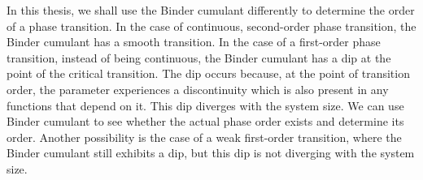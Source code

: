 \par
In this thesis, we shall use the Binder cumulant differently to determine the order of a phase transition. In the case of continuous, second-order phase transition, the Binder cumulant has a smooth transition. In the case of a first-order phase transition, instead of being continuous, the Binder cumulant has a dip at the point of the critical transition. The dip occurs because, at the point of transition order, the parameter experiences a discontinuity which is also present in any functions that depend on it. This dip diverges with the system size\cite{bindeCumulant}. We can use Binder cumulant to see whether the actual phase order exists and determine its order. Another possibility is the case of a weak first-order transition, where the Binder cumulant still exhibits a dip, but this dip is not diverging with the system size.
\newpage
